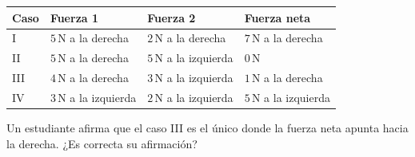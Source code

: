 \documentclass[
  spanish,
  letterpaper,
  12pt,
  oneside,
  open=any,
  DIV=15]{scrbook}
\newcounter{none} %
\begin{document}
{\def\LTcaptype{none} %
\begin{longtable}[]{@{}
  >{\raggedright\arraybackslash}p{}
  >{\raggedright\arraybackslash}p{}
  >{\raggedright\arraybackslash}p{}
  >{\raggedright\arraybackslash}p{}@{}}
\toprule\noalign{}
\begin{minipage}[b]{\linewidth}\raggedright
Caso
\end{minipage} & \begin{minipage}[b]{\linewidth}\raggedright
Fuerza 1
\end{minipage} & \begin{minipage}[b]{\linewidth}\raggedright
Fuerza 2
\end{minipage} & \begin{minipage}[b]{\linewidth}\raggedright
Fuerza neta
\end{minipage} \\
\midrule\noalign{}
\endhead
\bottomrule\noalign{}
\endlastfoot
I & \(5\,\text{N}\) a la derecha & \(2\,\text{N}\) a la derecha &
\(7\,\text{N}\) a la derecha \\
II & \(5\,\text{N}\) a la derecha & \(5\,\text{N}\) a la izquierda &
\(0\,\text{N}\) \\
III & \(4\,\text{N}\) a la derecha & \(3\,\text{N}\) a la izquierda &
\(1\,\text{N}\) a la derecha \\
IV & \(3\,\text{N}\) a la izquierda & \(2\,\text{N}\) a la izquierda &
\(5\,\text{N}\) a la izquierda \\
\end{longtable}
}

Un estudiante afirma que el caso III es el único donde la fuerza neta
apunta hacia la derecha. ¿Es correcta su afirmación?
\end{document}
